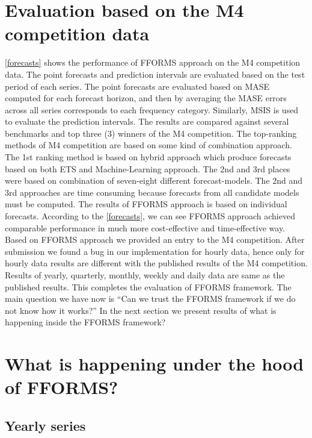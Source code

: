 \documentclass[11pt,a4paper,]{article}
\begin{document}
\hypertarget{results1}{%
\section{Evaluation based on the M4 competition data}\label{results1}}

\autoref{forecasts} shows the performance of FFORMS approach on the M4 competition data. The point forecasts and prediction intervals are evaluated based on the test period of each series. The point forecasts are evaluated based on MASE computed for each forecast horizon, and then by averaging the MASE errors across all series corresponds to each frequency category. Similarly, MSIS is used to evaluate the prediction intervals. The results are compared against several benchmarks and top three (3) winners of the M4 competition. The top-ranking methods of M4 competition are based on some kind of combination approach. The 1st ranking method is based on hybrid approach which produce forecasts based on both ETS and Machine-Learning approach. The 2nd and 3rd places were based on combination of seven-eight different forecast-models. The 2nd and 3rd approaches are time consuming because forecasts from all candidate models must be computed. The results of FFORMS approach is based on individual forecasts. According to the \autoref{forecasts}, we can see FFORMS approach achieved comparable performance in much more cost-effective and time-effective way. Based on FFORMS approach we provided an entry to the M4 competition. After submission we found a bug in our implementation for hourly data, hence only for hourly data results are different with the published results of the M4 competition. Results of yearly, quarterly, monthly, weekly and daily data are same as the published results. This completes the evaluation of FFORMS framework. The main question we have now is ``Can we trust the FFORMS framework if we do not know how it works?'' In the next section we present results of what is happening inside the FFORMS framework?

\hypertarget{results2}{%
\section{What is happening under the hood of FFORMS?}\label{results2}}

\hypertarget{yearly-series}{%
\subsection{Yearly series}\label{yearly-series}}
\end{document}
